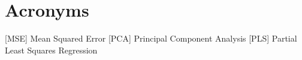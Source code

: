 
\section*{Acronyms} 

\singlespacing
{}

\begin{acronym} [PHWT123456]
          [MSE]   {Mean Squared Error}
          [PCA]   {Principal Component Analysis}
          [PLS]   {Partial Least Squares Regression}
\end{acronym}
\newpage
